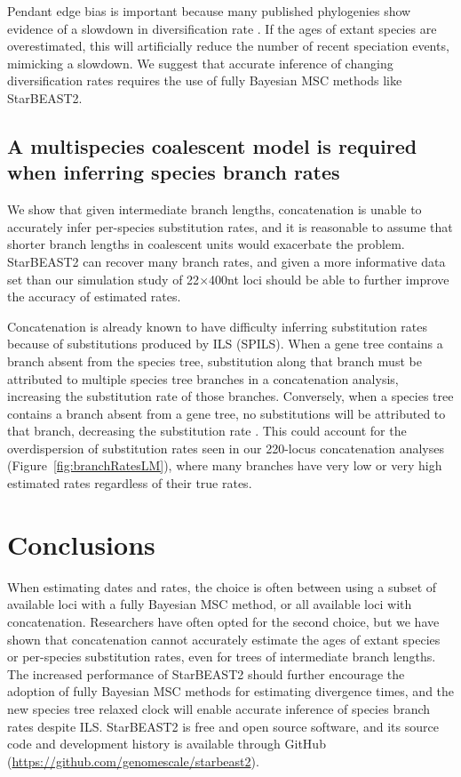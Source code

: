 \documentclass[12pt]{article}
\begin{document}
Pendant edge bias is important because many published phylogenies show evidence
of a slowdown in diversification rate \citep{Moen2014190}. If the ages of extant
species are overestimated, this will artificially reduce the number of recent speciation events,
mimicking a slowdown. We suggest that accurate inference of changing
diversification rates requires the use of fully Bayesian MSC methods like
StarBEAST2.

\subsection*{A multispecies coalescent model is required when inferring species branch rates}

We show that given intermediate branch lengths, concatenation is unable to
accurately infer per-species substitution rates, and it is reasonable to assume
that shorter branch lengths in coalescent units would exacerbate the problem.
StarBEAST2 can recover many branch rates, and given a more informative data set
than our simulation study of 22$\times$400nt loci should be able to further improve
the accuracy of estimated rates.

Concatenation is already known to have difficulty inferring substitution rates
because of substitutions produced by ILS (SPILS). When a
gene tree contains a branch absent from the species tree, substitution along
that branch must be attributed to multiple species tree branches in a
concatenation analysis, increasing the substitution rate of those branches.
Conversely, when a species tree contains a branch absent from a gene tree, no
substitutions will be attributed to that branch, decreasing the substitution
rate \citep{Mendes28022016}. This could account for the overdispersion of
substitution rates seen in our 220-locus concatenation analyses
(Figure~\ref{fig:branchRatesLM}), where many branches have very low or very high
estimated rates regardless of their true rates.

\section*{Conclusions}

When estimating dates and rates, the choice is often between using a subset of
available loci with a fully Bayesian MSC method, or all available loci with
concatenation. Researchers have often opted for the second choice, but we have
shown that concatenation cannot accurately estimate the ages of extant species
or per-species substitution rates, even for trees of intermediate branch lengths. The
increased performance of StarBEAST2 should further encourage the adoption of
fully Bayesian MSC methods for estimating divergence times, and the new species
tree relaxed clock will enable accurate inference of species branch rates despite
ILS. StarBEAST2 is free and open source software, and its source code and
development history is available through GitHub
(\url{https://github.com/genomescale/starbeast2}).
\end{document}
